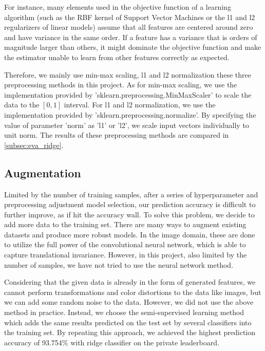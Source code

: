 \documentclass[10pt,journal,compsoc]{IEEEtran}
\begin{document}
For instance, many elements used in the objective function of a learning algorithm (such as the RBF kernel of Support Vector Machines or the l1 and l2 regularizers of linear models) assume that all features are centered around zero and have variance in the same order. If a feature has a variance that is orders of magnitude larger than others, it might dominate the objective function and make the estimator unable to learn from other features correctly as expected.

Therefore, we mainly use min-max scaling, l1 and l2 normalization these three preprocessing methods in this project. As for min-max scaling, we use the implementation provided by 'sklearn.preprocessing.MinMaxScaler' to scale the data to the $[0,1]$ interval. For l1 and l2 normalization, we use the implementation provided by 'sklearn.preprocessing.normalize'. By specifying the value of parameter 'norm' as 'l1' or 'l2', we scale input vectors individually to unit norm. The results of these preprocessing methods are compared in \ref{subsec:eva_ridge}.

\subsection{Augmentation}
\label{subsec:augmentation}

Limited by the number of training samples, after a series of hyperparameter and preprocessing adjustment model selection, our prediction accuracy is difficult to further improve, as if hit the accuracy wall. To solve this problem, we decide to add more data to the training set. There are many ways to augment existing datasets and produce more robust models. In the image domain, these are done to utilize the full power of the convolutional neural network, which is able to capture translational invariance. However, in this project, also limited by the number of samples, we have not tried to use the neural network method.

Considering that the given data is already in the form of generated features, we cannot perform transformations and color distortions to the data like images, but we can add some random noise to the data. However, we did not use the above method in practice. Instead, we choose the semi-supervised learning method which adds the same results predicted on the test set by several classifiers into the training set. By repeating this approach, we achieved the highest prediction accuracy of 93.754\% with ridge classifier on the private leaderboard.
\end{document}

